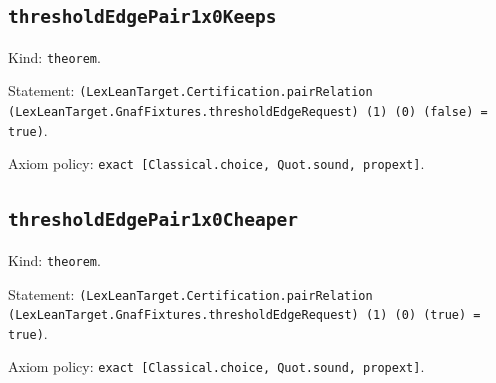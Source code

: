 \documentclass[11pt]{article}
\begin{document}
\subsection*{\texttt{thresholdEdgePair1x0Keeps}}
\noindent Kind: \texttt{theorem}.\par
\noindent Statement: \texttt{(LexLeanTarget.Certification.pairRelation (LexLeanTarget.GnafFixtures.thresholdEdgeRequest) (1) (0) (false) = true)}.\par
\noindent Axiom policy: \texttt{exact [Classical.choice, Quot.sound, propext]}.\par
\subsection*{\texttt{thresholdEdgePair1x0Cheaper}}
\noindent Kind: \texttt{theorem}.\par
\noindent Statement: \texttt{(LexLeanTarget.Certification.pairRelation (LexLeanTarget.GnafFixtures.thresholdEdgeRequest) (1) (0) (true) = true)}.\par
\noindent Axiom policy: \texttt{exact [Classical.choice, Quot.sound, propext]}.\par
\end{document}
